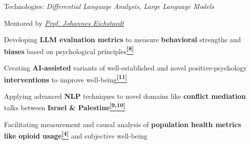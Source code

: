 
\vspace{-3mm}
\begin{cvskills}

{
\begin{cvitems}
\item[] Technologies: \emph{Differential Language Analysis, Large Language Models}
\item[] Mentored by \textit{\href{https://hai.stanford.edu/people/johannes-eichstaedt}{Prof. Johannes Eichstaedt}}
\item Developing  \textbf{\bodyfontlight LLM evaluation metrics} to measure \textbf{\bodyfontlight behavioral} strengths and \textbf{\bodyfontlight biases} based on psychological principles\textbf{\bodyfontlight \hyperref[sec:llmpsych]{\textsuperscript{[8]}}}
\item Creating \textbf{\bodyfontlight AI-assisted} variants of well-established and novel positive-psychology \textbf{\bodyfontlight interventions} to improve well-being\textbf{\bodyfontlight \hyperref[sec:wellbeing]{\textsuperscript{[11]}}}
\item Applying advanced \textbf{\bodyfontlight NLP} techniques to novel domains like \textbf{\bodyfontlight conflict mediation} talks between \textbf{\bodyfontlight Israel \& Palestine}\textbf{\bodyfontlight \hyperref[sec:oliversubmitted]{\textsuperscript{[9,}}}\textbf{\bodyfontlight \hyperref[sec:oliverprep]{\textsuperscript{10]}}}
\item Facilitating measurement and causal analysis of \textbf{\bodyfontlight population health metrics like opioid usage}\textbf{\bodyfontlight \hyperref[sec:adampnas]{\textsuperscript{[4]}}} and subjective well-being
\end{cvitems}
}
\end{cvskills}

